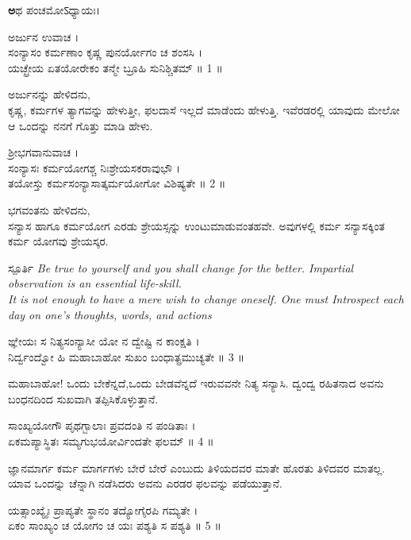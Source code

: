 \kanfont
\begin{center}\aksharfont\textbf
ಅಥ ಪಂಚಮೋऽಧ್ಯಾಯಃ।\\
\end{center}
ಅರ್ಜುನ ಉವಾಚ ।\\
ಸಂನ್ಯಾಸಂ ಕರ್ಮಣಾಂ ಕೃಷ್ಣ ಪುನರ್ಯೋಗಂ ಚ ಶಂಸಸಿ ।\\
ಯಚ್ಛ್ರೇಯ ಏತಯೋರೇಕಂ ತನ್ಮೇ ಬ್ರೂಹಿ ಸುನಿಶ್ಚಿತಮ್ ॥ 1 ॥
\begin{quoting}
ಅರ್ಜುನನ್ನು ಹೇಳಿದನು,\\
ಕೃಷ್ಣ, ಕರ್ಮಗಳ ತ್ಯಾಗವನ್ನು ಹೇಳುತ್ತೀ,  ಫಲದಾಸೆ ಇಲ್ಲದೆ ಮಾಡೆಂದು ಹೇಳುತ್ತಿ. ಇವೆರಡರಲ್ಲಿ ಯಾವುದು ಮೇಲೋ ಆ ಒಂದನ್ನು ನನಗೆ ಗೊತ್ತು ಮಾಡಿ ಹೇಳು.\\
\end{quoting}
ಶ್ರೀಭಗವಾನುವಾಚ ।\\
ಸಂನ್ಯಾಸಃ ಕರ್ಮಯೋಗಶ್ಚ ನಿಃಶ್ರೇಯಸಕರಾವುಭೌ ।\\
ತಯೋಸ್ತು ಕರ್ಮಸಂನ್ಯಾಸಾತ್ಕರ್ಮಯೋಗೋ ವಿಶಿಷ್ಯತೇ ॥ 2 ॥
\begin{quoting}
ಭಗವಂತನು ಹೇಳಿದನು,\\
ಸನ್ಯಾಸ ಹಾಗೂ ಕರ್ಮಯೋಗ ಎರಡು ಶ್ರೇಯಸ್ಸನ್ನು ಉಂಟುಮಾಡುವಂತಹವೇ. ಅವುಗಳಲ್ಲಿ ಕರ್ಮ ಸನ್ಯಾಸಕ್ಕಿಂತ ಕರ್ಮ ಯೋಗವು ಶ್ರೇಯಸ್ಕರ.\\
\begin{inspiration}{\kanfont ಸ್ಪೂರ್ತಿ}
\small\it
Be true to yourself and you shall change for the better. Impartial observation is an essential life-skill.\\
It is not enough to have a mere wish to change oneself. One must Introspect each day on one’s thoughts, words, and actions
\end{inspiration}
\end{quoting}
ಙ್ಞೇಯಃ ಸ ನಿತ್ಯಸಂನ್ಯಾಸೀ ಯೋ ನ ದ್ವೇಷ್ಟಿ ನ ಕಾಂಕ್ಷತಿ ।\\
ನಿರ್ದ್ವಂದ್ವೋ ಹಿ ಮಹಾಬಾಹೋ ಸುಖಂ ಬಂಧಾತ್ಪ್ರಮುಚ್ಯತೇ ॥ 3 ॥
\begin{quoting}
ಮಹಾಬಾಹೋ! ಒಂದು ಬೇಕೆನ್ನದೆ,ಒಂದು ಬೇಡವೆನ್ನದೆ ಇರುವವನೇ ನಿತ್ಯ ಸನ್ಯಾಸಿ. ದ್ವಂದ್ವ ರಹಿತನಾದ ಅವನು ಬಂಧನದಿಂದ ಸುಖವಾಗಿ ತಪ್ಪಿಸಿಕೊಳ್ಳುತ್ತಾನೆ.\\
\end{quoting}
ಸಾಂಖ್ಯಯೋಗೌ ಪೃಥಗ್ಬಾಲಾಃ ಪ್ರವದಂತಿ ನ ಪಂಡಿತಾಃ ।\\
ಏಕಮಪ್ಯಾಸ್ಥಿತಃ ಸಮ್ಯಗುಭಯೋರ್ವಿಂದತೇ ಫಲಮ್ ॥ 4 ॥
\begin{quoting}
ಜ್ಞಾನಮಾರ್ಗ ಕರ್ಮ ಮಾರ್ಗಗಳು ಬೇರೆ ಬೇರೆ ಎಂಬುದು ತಿಳಿಯದವರ ಮಾತೇ ಹೊರತು ತಿಳಿದವರ ಮಾತಲ್ಲ. ಯಾವ ಒಂದನ್ನು ಚೆನ್ನಾಗಿ ನಡೆಸಿದರು ಅವನು ಎರಡರ ಫಲವನ್ನು ಪಡೆಯುತ್ತಾನೆ.\\
\end{quoting}
ಯತ್ಸಾಂಖ್ಯೈಃ ಪ್ರಾಪ್ಯತೇ ಸ್ಥಾನಂ ತದ್ಯೋಗೈರಪಿ ಗಮ್ಯತೇ ।\\
ಏಕಂ ಸಾಂಖ್ಯಂ ಚ ಯೋಗಂ ಚ ಯಃ ಪಶ್ಯತಿ ಸ ಪಶ್ಯತಿ ॥ 5 ॥
